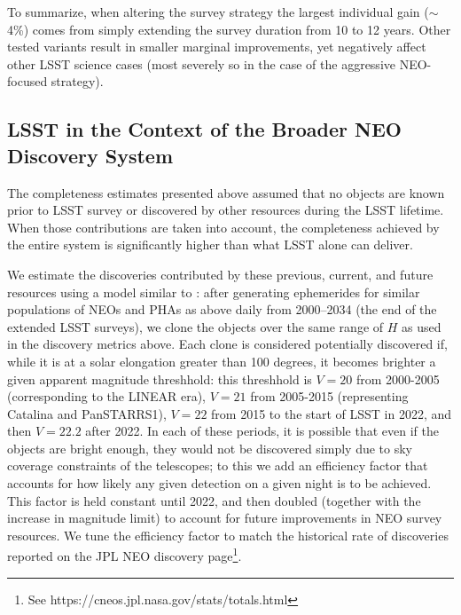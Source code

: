 To summarize, when altering the survey strategy the largest individual gain ($\sim$4\%) comes from simply extending the survey duration from 10 to 12 years. Other tested variants result in smaller marginal improvements, yet negatively affect other LSST science cases (most severely so in the case of the aggressive NEO-focused strategy).

\subsection{LSST in the Context of the Broader NEO Discovery System\label{sec:known}}

The completeness estimates presented above assumed that no objects are known prior to LSST survey or 
discovered by other resources during the LSST lifetime. When those contributions are taken into account, the completeness achieved by the entire system is significantly higher than what LSST alone can deliver.


We estimate the discoveries contributed by these previous, current, and future resources 
using a model similar to \citet{VeresChesley2017neo}: 
after generating ephemerides for similar populations of NEOs and PHAs as above daily from 2000--2034 
(the end of the extended LSST surveys), we clone the objects over the same range of $H$ as 
used in the discovery metrics above. Each clone is considered potentially discovered if, while it is at
a solar elongation greater than 100 degrees, it becomes brighter a given apparent magnitude threshhold: 
this threshhold is $V=20$ from 2000-2005 (corresponding to the LINEAR era), $V=21$ from 2005-2015 
(representing Catalina and PanSTARRS1), $V=22$ from 2015 to the start of LSST in 2022, and then
$V=22.2$ after 2022.  In each of these periods, it is possible that even if the objects are bright enough, 
they would not be discovered simply due to sky coverage constraints of the telescopes; to 
this we add an efficiency factor that accounts for how likely any given detection on a given night is to be achieved. 
This factor is held constant until 2022, and then doubled (together with the increase in magnitude 
limit) to account for future improvements in NEO survey resources. We tune the efficiency factor to match
the historical rate of discoveries reported on the JPL NEO discovery page\footnote{See https://cneos.jpl.nasa.gov/stats/totals.html}.

